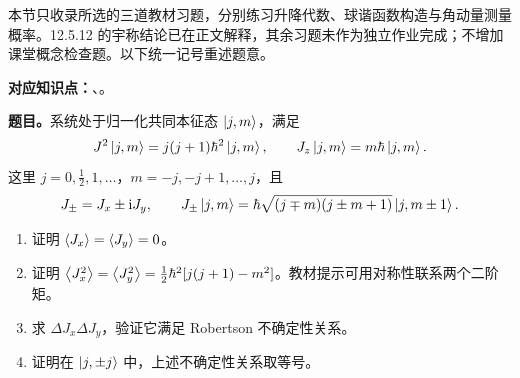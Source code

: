 本节只收录所选的三道教材习题，分别练习升降代数、球谐函数构造与角动量测量概率。12.5.12 的宇称结论已在正文解释，其余习题未作为独立作业完成；不增加课堂概念检查题。以下统一记号重述题意。

\textbf{对应知识点：}、。

\textbf{题目。}系统处于归一化共同本征态 $\left|j,m\right\rangle$，满足
\begin{equation}
  J^2\left|j,m\right\rangle=j(j+1)\hbar^2\left|j,m\right\rangle,\qquad
  J_z\left|j,m\right\rangle=m\hbar\left|j,m\right\rangle.
\end{equation}
这里 $j=0,\tfrac12,1,\ldots$，$m=-j,-j+1,\ldots,j$，且
\begin{equation}
  J_\pm=J_x\pm\mathrm{i} J_y,\qquad
  J_\pm\left|j,m\right\rangle
   =\hbar\sqrt{(j\mp m)(j\pm m+1)}\left|j,m\pm1\right\rangle.
\end{equation}
\begin{enumerate}
  \item 证明 $\left\langle J_x \right\rangle=\left\langle J_y \right\rangle=0$。
  \item 证明 $\left\langle J_x^2 \right\rangle=\left\langle J_y^2 \right\rangle=\tfrac12\hbar^2[j(j+1)-m^2]$。教材提示可用对称性联系两个二阶矩。
  \item 求 $\Delta J_x\Delta J_y$，验证它满足 Robertson 不确定性关系。
  \item 证明在 $\left|j,\pm j\right\rangle$ 中，上述不确定性关系取等号。
\end{enumerate}

